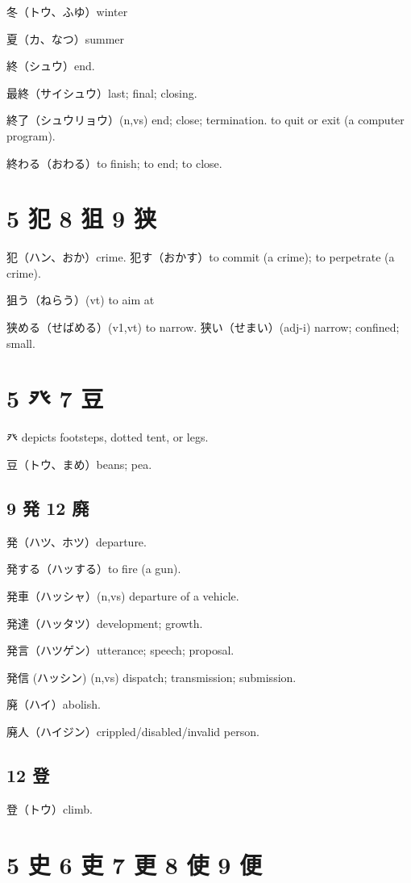 冬（トウ、ふゆ）winter

夏（カ、なつ）summer

終（シュウ）end.

最終（サイシュウ）last; final; closing.

終了（シュウリョウ）(n,vs)
end; close; termination.
to quit or exit (a computer program).

終わる（おわる）to finish; to end; to close.

\section{5 犯 8 狙 9 狭}

犯（ハン、おか）crime.
犯す（おかす）to commit (a crime); to perpetrate (a crime).

狙う（ねらう）(vt) to aim at

狭める（せばめる）(v1,vt) to narrow.
狭い（せまい）(adj-i) narrow; confined; small.

\section{5 癶 7 豆}

癶 depicts footsteps, dotted tent, or legs.

豆（トウ、まめ）beans; pea.

\subsection{9 発 12 廃}

発（ハツ、ホツ）departure.

発する（ハッする）to fire (a gun).

発車（ハッシャ）(n,vs) departure of a vehicle.

発達（ハッタツ）development; growth.

発言（ハツゲン）utterance; speech; proposal.

発信 (ハッシン) (n,vs) dispatch; transmission; submission.

廃（ハイ）abolish.

廃人（ハイジン）crippled/disabled/invalid person.

\subsection{12 登}

登（トウ）climb.

\section{5 史 6 吏 7 更 8 使 9 便}

